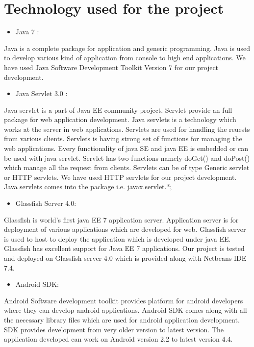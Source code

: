 \section{Technology used for the project}
\begin{itemize}
  \item Java 7 :
\end{itemize}
Java is a complete package for application and generic programming. Java is used to develop various kind of application from console to high end applications. We have used Java Software Development Toolkit Version 7 for our project development.
\\
\begin{itemize}
  \item Java Servlet 3.0 :
\end{itemize}
Java servlet is a part of Java EE community project. Servlet provide an full package for web application development. Java servlets is a technology which works at the server in web applications. Servlets are used for handling the reuests from various clients. Servlets is having strong set of functions for managing the web applications. Every functionality of java SE and java EE is embedded or can be used with java servlet. Servlet has two functions namely doGet() and doPost() which manage all the request from clients. Servlets can be of type Generic servlet or HTTP servlets. We have used HTTP servlets for our project development. Java servlets comes into the package i.e. javax.servlet.*; 
\\
\begin{itemize}
  \item Glassfish Server 4.0:
\end{itemize}
Glassfish is world's first java EE 7 application server. Application server is for deployment of various applications which are developed for web. Glassfish server is used to host to deploy the application which is developed under java EE. Glassfish has excellent support for Java EE 7 applications.  Our project is tested and deployed on Glassfish server 4.0 which is provided along with Netbeans IDE 7.4.
\\
\begin{itemize}
  \item Android SDK:
\end{itemize}
Android Software development toolkit provides platform for android developers where they can develop android applications.  Android SDK comes along with all the necessary library files which are used for android application development. SDK provides development from very older version to latest version. The application developed can work on Android version 2.2 to latest version 4.4.
